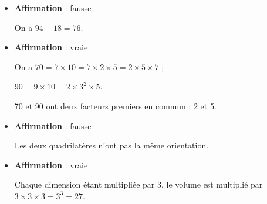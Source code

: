 \documentclass[10pt]{article}
\begin{document}
\begin{itemize}[label=$\bullet~~$]
\item \textbf{Affirmation } : fausse

On a $94 - 18 = 76$.%
%

\item \textbf{Affirmation } : vraie

On a $70 = 7 \times 10 = 7 \times 2 \times 5 = 2 \times 5 \times 7$ ;

$90 = 9 \times 10 = 2 \times 3^2 \times 5$.

70 et 90 ont deux facteurs premiers en commun : 2 et 5.

\item \textbf{Affirmation } : fausse

Les deux quadrilatères n'ont pas la même orientation.
\item \textbf{Affirmation } : vraie

Chaque dimension étant multipliée par 3, le volume est multiplié par $3 \times 3 \times 3 = 3^3 = 27$.
\end{itemize}

\vspace{0,5cm}
\end{document}
